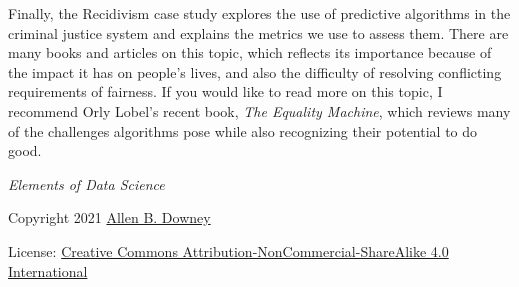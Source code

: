 Finally, the Recidivism case study explores the use of predictive
algorithms in the criminal justice system and explains the metrics we
use to assess them. There are many books and articles on this topic,
which reflects its importance because of the impact it has on people's
lives, and also the difficulty of resolving conflicting requirements of
fairness. If you would like to read more on this topic, I recommend Orly
Lobel's recent book, \emph{The Equality Machine}, which reviews many of
the challenges algorithms pose while also recognizing their potential to
do good.

\emph{Elements of Data Science}

Copyright 2021 \href{https://allendowney.com}{Allen B. Downey}

License:
\href{https://creativecommons.org/licenses/by-nc-sa/4.0/}{Creative
Commons Attribution-NonCommercial-ShareAlike 4.0 International}

